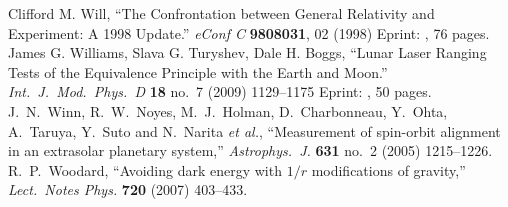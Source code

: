 \begin{thebibliography}{99}
  Clifford M. Will,\newblock
  ``The Confrontation between General Relativity and Experiment: A 1998 Update.''\newblock
  \emph{eConf C} {\bf 9808031}, 02 (1998)\newblock
  Eprint: , 76 pages.
  James G. Williams, Slava G. Turyshev, Dale H. Boggs,\newblock
  ``Lunar Laser Ranging Tests of the Equivalence Principle with the Earth and Moon.''\newblock
  \emph{Int.\ J.\ Mod.\ Phys.\ D} {\bf 18} no.~7 (2009) 1129--1175\newblock
  Eprint: , 50 pages.
  J.~N.~Winn, R.~W.~Noyes, M.~J.~Holman, D.~Charbonneau, Y.~Ohta, A.~Taruya, Y.~Suto and N.~Narita {\it et al.},\newblock
  ``Measurement of spin-orbit alignment in an extrasolar planetary system,''\newblock
  \emph{Astrophys.\ J.} {\bf 631} no.~2 (2005) 1215--1226.
  R.~P.~Woodard,\newblock
  ``Avoiding dark energy with $1/r$ modifications of gravity,''\newblock
  \emph{Lect.\ Notes Phys.} {\bf 720} (2007) 403--433.
\end{thebibliography}
%
%
\renewcommand\refname{Advanced Relativity}
